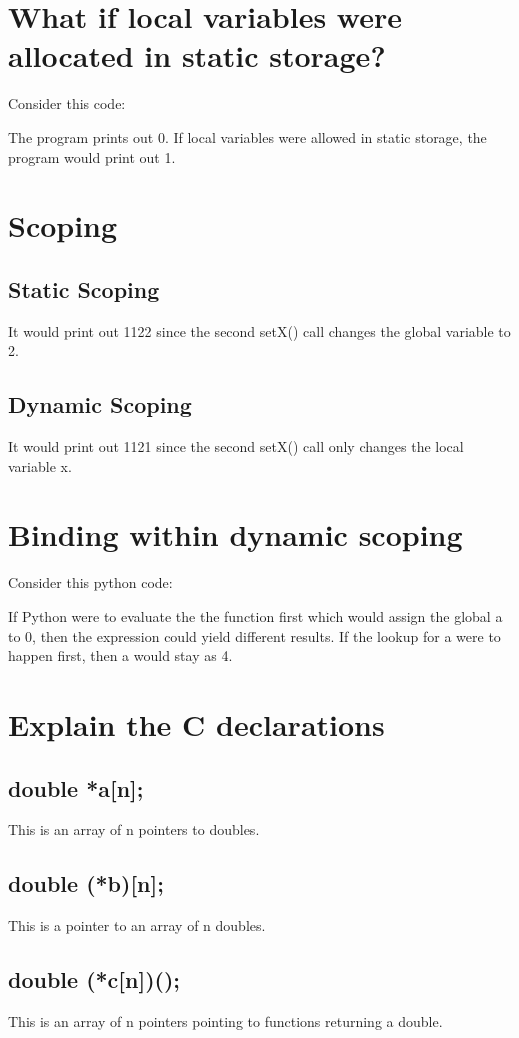 \documentclass[11pt, oneside]{article}   	%
\begin{document}
\section{What if local variables were allocated in static storage?}
Consider this code:

The program prints out 0. If local variables were allowed in static storage, the program would print out 1.

\section{Scoping}
\subsection{Static Scoping}
It would print out 1122 since the second setX() call changes the global variable to 2.
\subsection{Dynamic Scoping}
It would print out 1121 since the second setX() call only changes the local variable x.

\section{Binding within dynamic scoping}
Consider this python code:

If Python were to evaluate the the function first which would assign the global a to 0, then the expression could yield different results. If the lookup for a were to happen first, then a would stay as 4.

\section{Explain the C declarations}

\subsection{double *a[n];}
This is an array of n pointers to doubles.
\subsection{double (*b)[n];}
This is a pointer to an array of n doubles.
\subsection{double (*c[n])();}
This is an array of n pointers pointing to functions returning a double.
\end{document}
